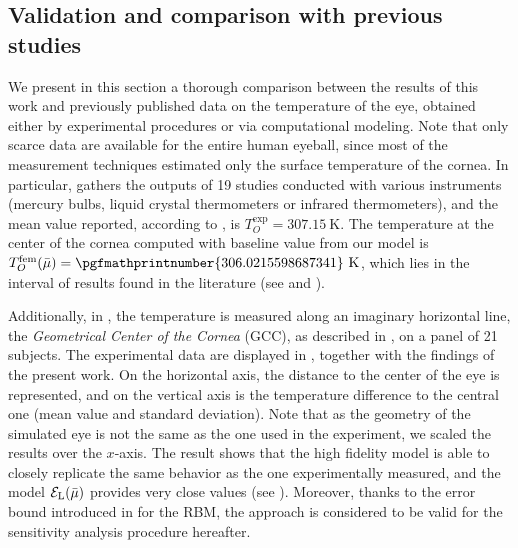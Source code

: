 \subsection{Validation and comparison with previous studies}
\label{sec:validation}

We present in this section a thorough comparison between the results of this work and previously published data on the temperature of the eye,
obtained either by experimental procedures or via computational modeling.
Note that only scarce data are available for the entire human eyeball, since most of the measurement techniques estimated only the surface temperature of the cornea.
In particular, \cite{Efron1989OcularST} gathers the outputs of 19 studies conducted with various instruments (mercury bulbs, liquid crystal thermometers or infrared thermometers),
and the mean value reported, according to \cite{NG2006268}, is $T_O^\text{exp} = \qty{307.15}{\kelvin}$.
The temperature at the center of the cornea computed with baseline value from our model is $T_O^\fem(\bar{\mu}) = \pgfmathprintnumber{306.0215598687341}~\unit{\kelvin}$,
which lies in the interval of results found in the literature (see \cite[Table 1]{Efron1989OcularST} and \cite[Table 9]{NG2006268}).

Additionally, in \cite{Efron1989OcularST}, the temperature is measured along an imaginary horizontal line, the \emph{Geometrical Center of the Cornea} (GCC), as described in , on a panel of 21 subjects.
The experimental data are displayed in , together with the findings of the present work. %
On the horizontal axis, the distance to the center of the eye is represented, and on the vertical axis is the temperature difference to the central one (mean value and standard deviation).
Note that as the geometry of the simulated eye is not the same as the one used in the experiment, we scaled the results over the $x$-axis.
The result shows that the high fidelity model is able to closely replicate the same behavior as the one experimentally measured,
and the model $\mathcal{E}_\text{L}(\bar{\mu})$ provides very close values (see ).
Moreover, thanks to the error bound introduced in  for the RBM, the approach is considered to be valid for the sensitivity analysis procedure hereafter.


\gccEfron
{}\gccfeel
{}\gccli


